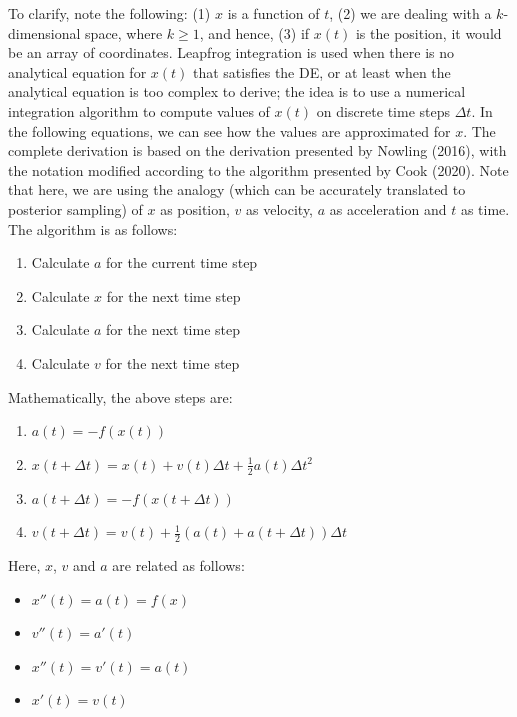 \documentclass[conference]{IEEEtran}
\begin{document}
To clarify, note the following: (1) $x$ is a function of $t$, (2) we are dealing with a $k$-dimensional space, where $k \geq 1$, and hence, (3) if $x(t)$ is the position, it would be an array of coordinates. Leapfrog integration is used when there is no analytical equation for $x(t)$ that satisfies the DE, or at least when the analytical equation is too complex to derive; the idea is to use a numerical integration algorithm to compute values of $x(t)$ on discrete time steps $\Delta t$. In the following equations, we can see how the values are approximated for $x$. The complete derivation is based on the derivation presented by Nowling (2016), with the notation modified according to the algorithm presented by Cook (2020). Note that here, we are using the analogy (which can be accurately translated to posterior sampling) of $x$ as position, $v$ as velocity, $a$ as acceleration and $t$ as time. The algorithm is as follows:\\

\begin{enumerate}
	\item Calculate $a$ for the current time step
	\item Calculate $x$ for the next time step
	\item Calculate $a$ for the next time step
	\item Calculate $v$ for the next time step\\
\end{enumerate}

Mathematically, the above steps are:\\

\begin{enumerate}
	\item $a(t) = -f(x(t))$
	\item $x(t + \Delta t) = x(t) + v(t)\Delta t + \frac{1}{2}a(t)\Delta t^2$
	\item $a(t + \Delta t) = -f(x(t+\Delta t))$
	\item $v(t + \Delta t)=v(t) + \frac{1}{2}(a(t) + a(t + \Delta t))\Delta t$\\
\end{enumerate}

Here, $x$, $v$ and $a$ are related as follows:\\

\begin{itemize}
	\item $x''(t) = a(t) = f(x)$
	\item $v''(t) = a'(t)$
	\item $x''(t) = v'(t) = a(t)$
	\item $x'(t) = v(t)$\\
\end{itemize}
\end{document}
